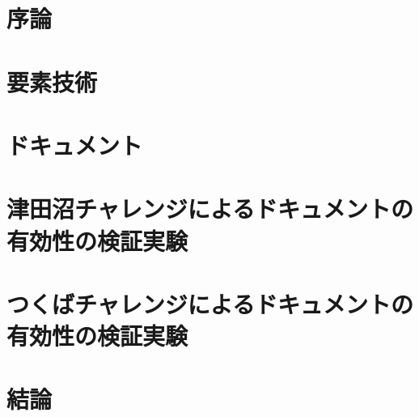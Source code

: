 \chapter{序論}
\label{chap:introduction}
%
%
%

\chapter{要素技術}

\chapter{ドキュメント}

\chapter{津田沼チャレンジによるドキュメントの有効性の検証実験}

\chapter{つくばチャレンジによるドキュメントの有効性の検証実験}

\chapter{結論}
